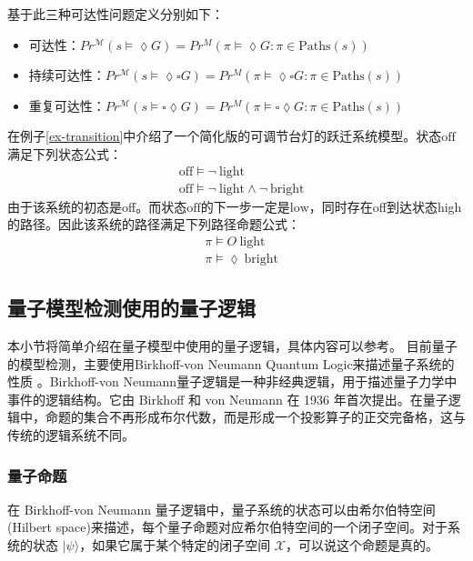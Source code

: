 基于此三种可达性问题定义分别如下：
\begin{itemize}
    \item 可达性：\( Pr^{\mathcal{M}}(s \models \lozenge G) = Pr^M(\pi \models \lozenge G : \pi \in \text{Paths}(s))\)
    \item 持续可达性：\( Pr^{\mathcal{M}}(s \models \lozenge \square G) = Pr^M(\pi \models \lozenge \square G : \pi \in \text{Paths}(s))\)
    \item 重复可达性：\( Pr^{\mathcal{M}}(s \models\square \lozenge G) = Pr^M(\pi \models \square\lozenge G : \pi \in \text{Paths}(s))\)
\end{itemize}
\begin{example}
    在例子\ref{ex-transition}中介绍了一个简化版的可调节台灯的跃迁系统模型。状态\(\text{off}\)满足下列状态公式：
    \begin{align}
        & \text{off} \models \lnot\ \text{light} \\
        & \text{off} \models \lnot\ \text{light} \land \lnot\ \text{bright}
    \end{align}
    由于该系统的初态是off。而状态\(\text{off}\)的下一步一定是\(\text{low}\)，同时存在off到达状态high的路径。因此该系统的路径满足下列路径命题公式：
    \begin{align}
        & \pi \models O\ \text{light} \\
        & \pi \models \lozenge\ \text{bright}
    \end{align}
    
\end{example}

\subsection{量子模型检测使用的量子逻辑}
本小节将简单介绍在量子模型中使用的量子逻辑，具体内容可以参考\citep{2021}。
目前量子的模型检测，主要使用Birkhoff-von Neumann Quantum Logic来描述量子系统的性质
。Birkhoff-von Neumann量子逻辑是一种非经典逻辑，用于描述量子力学中事件的逻辑结构。它由 Birkhoff 和 von Neumann 在 1936 年首次提出。在量子逻辑中，命题的集合不再形成布尔代数，而是形成一个投影算子的正交完备格，这与传统的逻辑系统不同。


\subsubsection*{量子命题}
\label{sec-logic}
在 Birkhoff-von Neumann 量子逻辑中，量子系统的状态可以由希尔伯特空间(Hilbert space)来描述，每个量子命题对应希尔伯特空间的一个闭子空间。对于系统的状态 \(|\psi\rangle\)，如果它属于某个特定的闭子空间 \( \mathcal{X} \)，可以说这个命题是真的。

